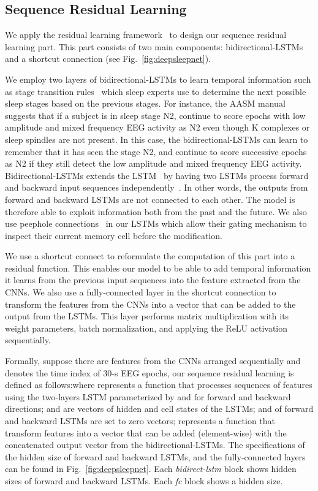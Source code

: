\documentclass[journal,twoside]{IEEEtran}
\begin{document}
\subsection{Sequence Residual Learning} \label{sec:sequence_res_learn}
We apply the residual learning framework~\cite{he2015} to design our sequence residual learning part. This part consists of two main components: bidirectional-LSTMs~\cite{schuster1997} and a shortcut connection (see Fig.~\ref{fig:deepsleepnet}).

We employ two layers of bidirectional-LSTMs to learn temporal information such as stage transition rules~\cite{iber2007} which sleep experts use to determine the next possible sleep stages based on the previous stages. For instance, the AASM manual suggests that if a subject is in sleep stage N2, continue to score epochs with low amplitude and mixed frequency EEG activity as N2 even though K complexes or sleep spindles are not present. In this case, the bidirectional-LSTMs can learn to remember that it has seen the stage N2, and continue to score successive epochs as N2 if they still detect the low amplitude and mixed frequency EEG activity. Bidirectional-LSTMs extends the LSTM~\cite{hochreiter1997} by having two LSTMs process forward and backward input sequences independently~\cite{schuster1997}. In other words, the outputs from forward and backward LSTMs are not connected to each other. The model is therefore able to exploit information both from the past and the future. We also use peephole connections~\cite{gers2000,sak2014} in our LSTMs which allow their gating mechanism to inspect their current memory cell before the modification.

We use a shortcut connect to reformulate the computation of this part into a residual function. This enables our model to be able to add temporal information it learns from the previous input sequences into the feature extracted from the CNNs. We also use a fully-connected layer in the shortcut connection to transform the features from the CNNs into a vector that can be added to the output from the LSTMs. This layer performs matrix multiplication with its weight parameters, batch normalization, and applying the ReLU activation sequentially.

Formally, suppose there are  features from the CNNs  arranged sequentially and  denotes the time index of 30-s EEG epochs, our sequence residual learning is defined as follows:where  represents a function that processes sequences of features  using the two-layers LSTM parameterized by  and  for forward and backward directions;  and  are vectors of hidden and cell states of the LSTMs;  and  of forward and backward LSTMs are set to zero vectors;  represents a function that transform features  into a vector that can be added (element-wise) with the concatenated output vector  from the bidirectional-LSTMs. The specifications of the hidden size of forward and backward LSTMs, and the fully-connected layers can be found in Fig.~\ref{fig:deepsleepnet}. Each \textit{bidirect-lstm} block shows hidden sizes of forward and backward LSTMs. Each \textit{fc} block shows a hidden size.
\end{document}
